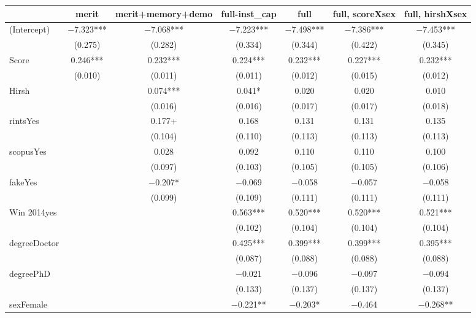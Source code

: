 \begin{table}
\centering
\begin{tabular}[t]{lcccccc}
\toprule
  & merit & merit+memory+demo & full-inst\_cap & full & full, scoreXsex & full, hirshXsex\\
\midrule
(Intercept) & \num{-7.323}*** & \num{-7.068}*** & \num{-7.223}*** & \num{-7.498}*** & \num{-7.386}*** & \num{-7.453}***\\
 & (\num{0.275}) & (\num{0.282}) & (\num{0.334}) & (\num{0.344}) & (\num{0.422}) & (\num{0.345})\\
Score & \num{0.246}*** & \num{0.232}*** & \num{0.224}*** & \num{0.232}*** & \num{0.227}*** & \num{0.232}***\\
 & (\num{0.010}) & (\num{0.011}) & (\num{0.011}) & (\num{0.012}) & (\num{0.015}) & (\num{0.012})\\
Hirsh &  & \num{0.074}*** & \num{0.041}* & \num{0.020} & \num{0.020} & \num{0.010}\\
 &  & (\num{0.016}) & (\num{0.016}) & (\num{0.017}) & (\num{0.017}) & (\num{0.018})\\
rintsYes &  & \num{0.177}+ & \num{0.168} & \num{0.131} & \num{0.131} & \num{0.135}\\
 &  & (\num{0.104}) & (\num{0.110}) & (\num{0.113}) & (\num{0.113}) & (\num{0.113})\\
scopusYes &  & \num{0.028} & \num{0.092} & \num{0.110} & \num{0.110} & \num{0.100}\\
 &  & (\num{0.097}) & (\num{0.103}) & (\num{0.105}) & (\num{0.105}) & (\num{0.106})\\
fakeYes &  & \num{-0.207}* & \num{-0.069} & \num{-0.058} & \num{-0.057} & \num{-0.058}\\
 &  & (\num{0.099}) & (\num{0.109}) & (\num{0.111}) & (\num{0.111}) & (\num{0.111})\\
Win 2014yes &  &  & \num{0.563}*** & \num{0.520}*** & \num{0.520}*** & \num{0.521}***\\
 &  &  & (\num{0.102}) & (\num{0.104}) & (\num{0.104}) & (\num{0.104})\\
degreeDoctor &  &  & \num{0.425}*** & \num{0.399}*** & \num{0.399}*** & \num{0.395}***\\
 &  &  & (\num{0.087}) & (\num{0.088}) & (\num{0.088}) & (\num{0.088})\\
degreePhD &  &  & \num{-0.021} & \num{-0.096} & \num{-0.097} & \num{-0.094}\\
 &  &  & (\num{0.133}) & (\num{0.137}) & (\num{0.137}) & (\num{0.137})\\
sexFemale &  &  & \num{-0.221}** & \num{-0.203}* & \num{-0.464} & \num{-0.268}**\\

\end{tabular}
\end{table}
